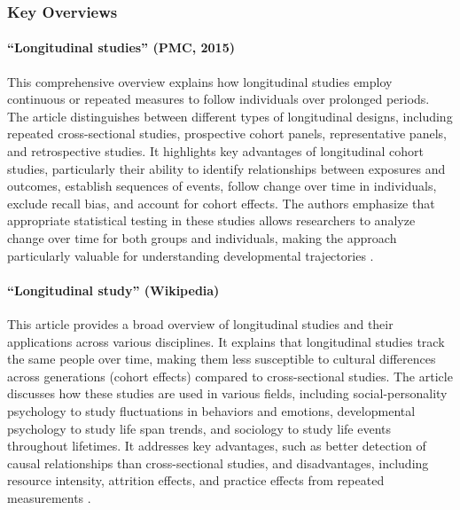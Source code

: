 \documentclass[../main.tex]{subfiles}
\begin{document}
\subsubsection{Key Overviews}

\paragraph{``Longitudinal studies'' (PMC, 2015)}
This comprehensive overview explains how longitudinal studies employ continuous or repeated measures to follow individuals over prolonged periods. The article distinguishes between different types of longitudinal designs, including repeated cross-sectional studies, prospective cohort panels, representative panels, and retrospective studies. It highlights key advantages of longitudinal cohort studies, particularly their ability to identify relationships between exposures and outcomes, establish sequences of events, follow change over time in individuals, exclude recall bias, and account for cohort effects. The authors emphasize that appropriate statistical testing in these studies allows researchers to analyze change over time for both groups and individuals, making the approach particularly valuable for understanding developmental trajectories \parencite{caruana2015longitudinal}.

\paragraph{``Longitudinal study'' (Wikipedia)}
This article provides a broad overview of longitudinal studies and their applications across various disciplines. It explains that longitudinal studies track the same people over time, making them less susceptible to cultural differences across generations (cohort effects) compared to cross-sectional studies. The article discusses how these studies are used in various fields, including social-personality psychology to study fluctuations in behaviors and emotions, developmental psychology to study life span trends, and sociology to study life events throughout lifetimes. It addresses key advantages, such as better detection of causal relationships than cross-sectional studies, and disadvantages, including resource intensity, attrition effects, and practice effects from repeated measurements \parencite{wikipedia2024longitudinal}.
\end{document}
